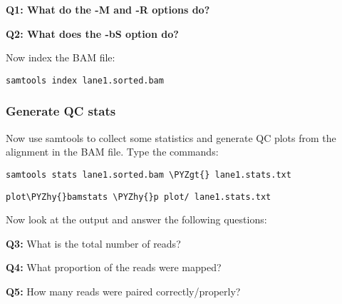 \documentclass[11pt]{article}
\makeatletter
\def\PYZgt{\char`\>}
\def\PYZhy{\char`\-}
\newcommand{\boxspacing}{\kern\kvtcb@left@rule\kern\kvtcb@boxsep}
\newcommand{\prompt}[4]{
        \ttfamily\llap{{\color{#2}[#3]:\hspace{3pt}#4}}\vspace{-\baselineskip}
    }
\makeatother
\begin{document}
    \textbf{Q1: What do the -M and -R options do?}

    \textbf{Q2: What does the -bS option do?}

    Now index the BAM file:

    \begin{tcolorbox}[breakable, size=fbox, boxrule=1pt, pad at break*=1mm,colback=cellbackground, colframe=cellborder]
\prompt{In}{incolor}{ }{\boxspacing}
\begin{Verbatim}[commandchars=\\\{\}]
samtools index lane1.sorted.bam
\end{Verbatim}
\end{tcolorbox}

    \hypertarget{generate-qc-stats}{%
\subsubsection{Generate QC stats}\label{generate-qc-stats}}

Now use samtools to collect some statistics and generate QC plots from
the alignment in the BAM file. Type the commands:

    \begin{tcolorbox}[breakable, size=fbox, boxrule=1pt, pad at break*=1mm,colback=cellbackground, colframe=cellborder]
\prompt{In}{incolor}{ }{\boxspacing}
\begin{Verbatim}[commandchars=\\\{\}]
samtools stats lane1.sorted.bam \PYZgt{} lane1.stats.txt
\end{Verbatim}
\end{tcolorbox}

    \begin{tcolorbox}[breakable, size=fbox, boxrule=1pt, pad at break*=1mm,colback=cellbackground, colframe=cellborder]
\prompt{In}{incolor}{ }{\boxspacing}
\begin{Verbatim}[commandchars=\\\{\}]
plot\PYZhy{}bamstats \PYZhy{}p plot/ lane1.stats.txt
\end{Verbatim}
\end{tcolorbox}

    Now look at the output and answer the following questions:

\textbf{Q3:} What is the total number of reads?

\textbf{Q4:} What proportion of the reads were mapped?

\textbf{Q5:} How many reads were paired correctly/properly?
\end{document}
